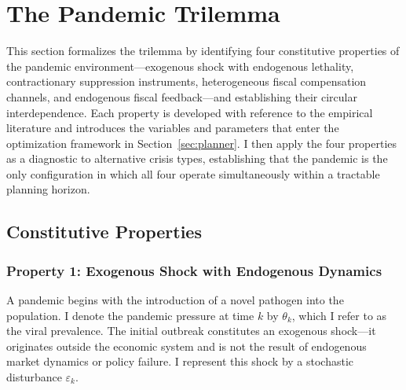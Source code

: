 \documentclass[12pt, a4paper]{article}
\begin{document}
\newpage

\section{The Pandemic Trilemma}
\label{sec:trilemma}

This section formalizes the trilemma by identifying four constitutive properties of the pandemic environment---exogenous shock with endogenous lethality, contractionary suppression instruments, heterogeneous fiscal compensation channels, and endogenous fiscal feedback---and establishing their circular interdependence. Each property is developed with reference to the empirical literature and introduces the variables and parameters that enter the optimization framework in Section~\ref{sec:planner}. I then apply the four properties as a diagnostic to alternative crisis types, establishing that the pandemic is the only configuration in which all four operate simultaneously within a tractable planning horizon.


\subsection{Constitutive Properties}
\label{subsec:properties}


\subsubsection*{Property 1: Exogenous Shock with Endogenous Dynamics}


A pandemic begins with the introduction of a novel pathogen into the population. I denote the pandemic pressure at time $k$ by $\theta_k$, which I refer to as the viral prevalence. The initial outbreak constitutes an exogenous shock---it originates outside the economic system and is not the result of endogenous market dynamics or policy failure. I represent this shock by a stochastic disturbance $\varepsilon_k$.
\end{document}
